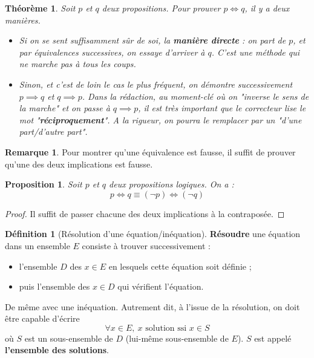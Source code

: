 \documentclass[french]{book}
\theoremstyle{plain}
\newtheorem{thm}{Théorème}[chapter]
\newtheorem{prop}{Proposition}[chapter]
\theoremstyle{definition}
\newtheorem{dfn}{Définition}[chapter]
\newtheorem{rmq}{Remarque}[chapter]
\theoremstyle{remark}
\begin{document}
\begin{thm}
	Soit $p$ et $q$ deux propositions. Pour prouver $p\iff q$, il y a deux manières.
	\begin{itemize}
		\item Si on se sent suffisamment sûr de soi, la \textbf{manière directe} : on part de $p$, et par équivalences successives, on essaye d'arriver à $q$. C'est une méthode qui ne marche pas à tous les coups.
		\item Sinon, et c'est de loin le cas le plus fréquent, on démontre successivement $p\implies q$ et $q\implies p$. Dans la rédaction, au moment-clé où on "inverse le sens de la marche" et on passe à $q\implies p$, il est très important que le correcteur lise le mot "\textbf{réciproquement}". A la rigueur, on pourra le remplacer par un "d'une part/d'autre part".
	\end{itemize}
\end{thm}
\begin{rmq}
	Pour montrer qu'une équivalence est fausse, il suffit de prouver qu'une des deux implications est fausse.
\end{rmq}
\begin{prop}
	Soit $p$ et $q$ deux propositions logiques. On a : $$p\iff q\equiv(\lnot p)\iff(\lnot q)$$
\end{prop}
\begin{proof}
	Il suffit de passer chacune des deux implications à la contraposée.
\end{proof}
\begin{dfn}[Résolution d'une équation/inéquation]
	\textbf{Résoudre} une équation dans un ensemble $E$ consiste à trouver successivement : \begin{itemize}
		\item l'ensemble $D$ des $x\in E$ en lesquels cette équation soit définie ; 
		\item puis l'ensemble des $x\in D$ qui vérifient l'équation.
	\end{itemize}
	De même avec une inéquation. Autrement dit, à l'issue de la résolution, on doit être capable d'écrire $$\forall x\in E,\ x\text{ solution ssi }x\in S$$ où $S$ est un sous-ensemble de $D$ (lui-même sous-ensemble de $E$). $S$ est appelé \textbf{l'ensemble des solutions}.
\end{dfn}
\end{document}
